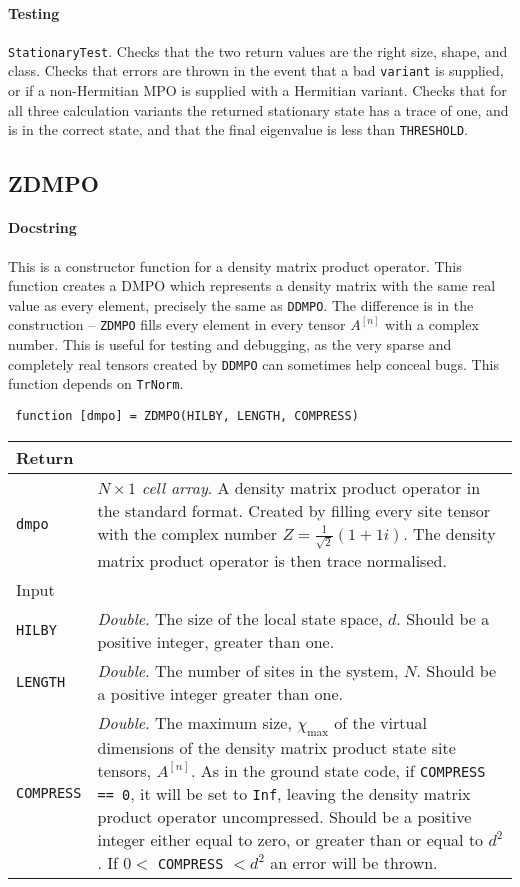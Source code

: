  \paragraph{Testing} \lstinline$StationaryTest$. Checks that the two return values are the right size, shape, and class. Checks that errors are thrown in the event that a bad \lstinline$variant$ is supplied, or if a non-Hermitian MPO is supplied with a Hermitian variant. Checks that for all three calculation variants the returned stationary state has a trace of one, and is in the correct state, and that the final eigenvalue is less than \lstinline$THRESHOLD$. 

 \subsection{ZDMPO}
 \paragraph{Docstring} This is a constructor function for a density matrix product operator. This function creates a DMPO which represents a density matrix with the same real value as every element, precisely the same as \lstinline$DDMPO$. The difference is in the construction -- \lstinline$ZDMPO$ fills every element in every tensor \(A^{[n]}\) with a complex number. This is useful for testing and debugging, as the very sparse and completely real tensors created by \lstinline$DDMPO$ can sometimes help conceal bugs. This function depends on \lstinline$TrNorm$.
 \begin{lstlisting}
 function [dmpo] = ZDMPO(HILBY, LENGTH, COMPRESS) \end{lstlisting}
 \begin{longtabu}{X[1,l]X[4,l]}
 \hline
 Return & \\ \hline
 \lstinline$dmpo$ & \emph{\(N \times 1\) cell array}. A density matrix product operator in the standard format. Created by filling every site tensor with the complex number \(Z = \frac{1}{\sqrt{2}}(1 + 1i)\). The density matrix product operator is then trace normalised. \\ \hline
 Input & \\ \hline
 \lstinline$HILBY$ & \emph{Double}. The size of the local state space, \(d\). Should be a positive integer, greater than one.  \\
 \lstinline$LENGTH$ & \emph{Double}. The number of sites in the system, \(N\). Should be a positive integer greater than one. \\
 \lstinline$COMPRESS$ & \emph{Double}. The maximum size, \(\chi_{\mathrm{max}}\) of the virtual dimensions of the density matrix product state site tensors, \(A^{[n]}\). As in the ground state code, if \lstinline$COMPRESS == 0$, it will be set to \lstinline$Inf$, leaving the density matrix product operator uncompressed. Should be a positive integer either equal to zero, or greater than or equal to \(d^{2}\). If \(0 <\) \lstinline$COMPRESS$ \(< d^{2}\) an error will be thrown. \\
 \hline
 \end{longtabu}

